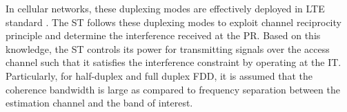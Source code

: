 In cellular networks, these duplexing modes are effectively deployed in LTE standard \cite{LTE09}. The ST follows these duplexing modes to exploit  channel reciprocity principle and determine the interference received at the PR. Based on this knowledge, the ST controls its power for transmitting signals over the access channel such that it satisfies the interference constraint by operating at the IT. Particularly, for half-duplex and full duplex FDD, it is assumed that the coherence bandwidth is large as compared to frequency separation between the estimation channel and the band of interest. 
